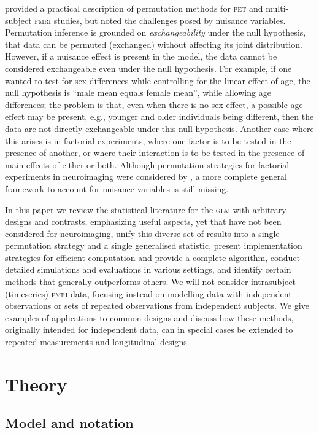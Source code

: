 \citet{Nichols2002} provided a practical description of permutation methods for \textsc{pet} and multi-subject \textsc{fmri} studies, but noted the challenges posed by nuisance variables. Permutation inference is grounded on \emph{exchangeability} under the null hypothesis, that data can be permuted (exchanged) without affecting its joint distribution. However, if a nuisance effect is present in the model, the data cannot be considered exchangeable even under the null hypothesis.  For example, if one wanted to test for sex differences while controlling for the linear effect of age, the null hypothesis is ``male mean equals female mean'', while allowing age differences; the problem is that, even when there is no sex effect, a possible age effect may be present, e.g., younger and older individuals being different, then the data are not directly exchangeable under this null hypothesis. Another case where this arises is in factorial experiments, where one factor is to be tested in the presence of another, or where their interaction is to be tested in the presence of main effects of either or both. Although permutation strategies for factorial experiments in neuroimaging were considered by \citet{Suckling2004}, a more complete general framework to account for nuisance variables is still missing.

In this paper we review the statistical literature for the \textsc{glm} with arbitrary designs and contrasts, emphasizing useful aspects, yet that have not been considered for neuroimaging, unify this diverse set of results into a single permutation strategy and a single generalised statistic, present implementation strategies for efficient computation and provide a complete algorithm, conduct detailed simulations and evaluations in various settings, and identify certain methods that generally outperforms others. We will not consider intrasubject (timeseries) \textsc{fmri} data, focusing instead on modelling data with independent observations or sets of repeated observations from independent subjects. We give examples of applications to common designs and discuss how these methods, originally intended for independent data, can in special cases be extended to repeated measurements and longitudinal designs.

\section{Theory}

\subsection{Model and notation}
\label{sec:model}

